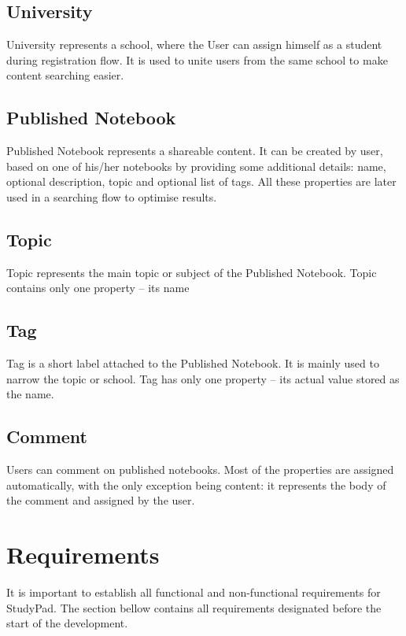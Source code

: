 \documentclass[thesis=B,english]{FITthesis}[2012/10/20]
\newcommand{\appname}{StudyPad}
\begin{document}
	
\subsection{University}
University represents a school, where the User can assign himself as a student during registration flow. It is used to unite users from the same school to make content searching easier. 

\subsection{Published Notebook}
Published Notebook represents a shareable content. It can be created by user, based on one of his/her notebooks by providing some additional details:
name, optional description,  topic and optional list of tags. All these properties are later used in a searching flow to optimise results.

\subsection{Topic}
Topic represents the main topic or subject of the Published Notebook. Topic contains only one property -- its name
\subsection{Tag}
Tag is a short label attached to the Published Notebook. It is mainly  used to narrow the topic or school. Tag has only one property -- its actual value stored as the name.

\subsection{Comment}
Users can comment on published notebooks. Most of the properties are assigned automatically, with the only exception being content: it represents the body of the comment and assigned by the user.


\newpage
\section{Requirements}
It is important to establish all functional and non-functional requirements for \appname. The section bellow contains all requirements designated  before the start of the development.
\end{document}
